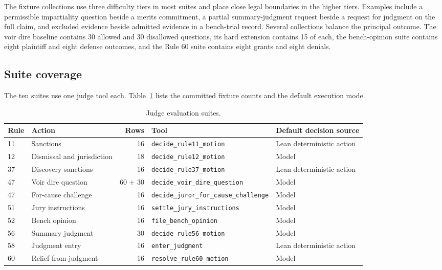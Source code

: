 \documentclass[11pt]{article}
\newcommand{\tool}[1]{\nolinkurl{#1}}
\begin{document}
The fixture collections use three difficulty tiers in most suites and place close legal boundaries in the higher tiers.  Examples include a permissible impartiality question beside a merits commitment, a partial summary-judgment request beside a request for judgment on the full claim, and excluded evidence beside admitted evidence in a bench-trial record.  Several collections balance the principal outcome.  The voir dire baseline contains 30 allowed and 30 disallowed questions, its hard extension contains 15 of each, the bench-opinion suite contains eight plaintiff and eight defense outcomes, and the Rule 60 suite contains eight grants and eight denials.

\subsection{Suite coverage}

The ten suites use one judge tool each.  Table~\ref{tab:suites} lists the committed fixture counts and the default execution mode.

\begin{table}[htbp]
\centering
\scriptsize
\caption{Judge evaluation suites.}
\label{tab:suites}
\begin{tabularx}{\textwidth}{@{}llrXX@{}}
\toprule
Rule & Action & Rows & Tool & Default decision source \\
\midrule
11 & Sanctions & 16 & \tool{decide_rule11_motion} & Lean deterministic action \\
12 & Dismissal and jurisdiction & 18 & \tool{decide_rule12_motion} & Model \\
37 & Discovery sanctions & 16 & \tool{decide_rule37_motion} & Lean deterministic action \\
47 & Voir dire question & 60 + 30 & \tool{decide_voir_dire_question} & Model \\
47 & For-cause challenge & 16 & \tool{decide_juror_for_cause_challenge} & Model \\
51 & Jury instructions & 16 & \tool{settle_jury_instructions} & Model \\
52 & Bench opinion & 16 & \tool{file_bench_opinion} & Model \\
56 & Summary judgment & 30 & \tool{decide_rule56_motion} & Model \\
58 & Judgment entry & 16 & \tool{enter_judgment} & Lean deterministic action \\
60 & Relief from judgment & 16 & \tool{resolve_rule60_motion} & Model \\
\bottomrule
\end{tabularx}
\end{table}
\end{document}
